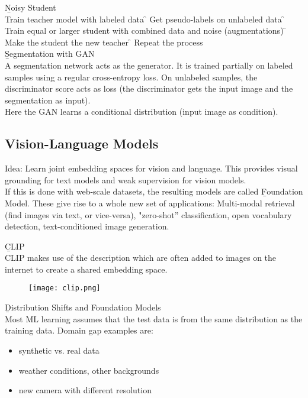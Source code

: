 \b{Noisy Student\\[0.5em]}
Train teacher model with labeled data \f{\to} Get pseudo-labels on unlabeled data \f{\to} Train equal or larger student with combined data and noise (augmentations) \f{\to} Make the student the new teacher \f{\to} Repeat the process\\

\b{Segmentation with GAN\\[0.5em]}
A segmentation network acts as the generator. It is trained partially on labeled samples using a regular cross-entropy loss. On unlabeled samples, the discriminator score acts as loss (the discriminator gets the input image and the segmentation as input).\\
Here the GAN learns a conditional distribution (input image as condition).


\subsection{Vision-Language Models}
Idea: Learn joint embedding spaces for vision and language. This provides visual grounding for text models and weak supervision for vision models.\\

If this is done with web-scale datasets, the resulting models are called \b{Foundation Model}. These give rise to a whole new set of applications: Multi-modal retrieval (find images via text, or vice-versa), "zero-shot” classification, open vocabulary detection, text-conditioned image generation.
\newpage

\b{CLIP\\[.5em]}
CLIP makes use of the description which are often added to images on the internet to create a shared embedding space.
\begin{figure}[h!]
    \centering
    \texttt{[image: clip.png]}
\end{figure}

\b{Distribution Shifts and Foundation Models\\[.5em]}
Most ML learning assumes that the test data is from the same distribution as the training data. Domain gap examples are:
\begin{itemize}
    \item synthetic vs. real data
    \item weather conditions, other backgrounds
    \item new camera with different resolution
\end{itemize}

